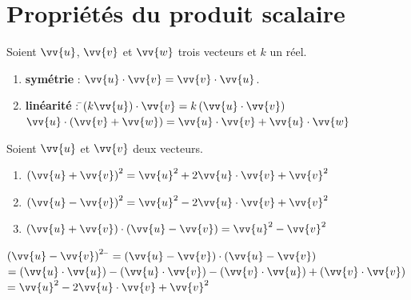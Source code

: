 \documentclass[a4paper,11pt,cours]{nsi} %
\begin{document}
\section{Propriétés du produit scalaire}
\begin{propriete}[s]
    Soient $\vv{u}$, $\vv{v}$ et $\vv{w}$ trois vecteurs et $k$ un réel.
    \begin{enumerate}[label=\textbullet]
        \item \textbf{symétrie} : $\vv{u} \cdot \vv{v} = \vv{v} \cdot \vv{u}$.
        \item \begin{tabbing}
            \textbf{linéarité} :  \=$\left(k\vv{u}\right) \cdot \vv{v} = k\left(\vv{u} \cdot \vv{v}\right)$\\
            \> $\vv{u} \cdot \left(\vv{v}+ \vv{w}\right) = \vv{u} \cdot \vv{v}+\vv{u}\cdot \vv{w}$\\
        \end{tabbing}
    \end{enumerate}
\end{propriete}

\begin{propriete}
    Soient $\vv{u}$ et $\vv{v}$ deux vecteurs.
    \begin{enumerate}[label=\textbullet]
        \item $\left(\vv{u}+\vv{v}\right)^2 = \vv{u}^2  + 2\vv{u} \cdot \vv{v}+ \vv{v}^2$
        \item $\left(\vv{u}-\vv{v}\right)^2 = \vv{u}^2  - 2\vv{u} \cdot \vv{v}+ \vv{v}^2$
        \item $\left(\vv{u}+\vv{v}\right) \cdot \left(\vv{u}-\vv{v}\right) = \vv{u}^2 - \vv{v}^2$
    \end{enumerate}
\end{propriete}

\begin{demonstration}[ (du point 2)]
    \begin{tabbing}
        $\left(\vv{u}-\vv{v}\right)^2$ \= $=\left(\vv{u}-\vv{v}\right) \cdot \left(\vv{u}-\vv{v}\right)$\\
        \> $=\left(\vv{u} \cdot \vv{u}\right) - \left(\vv{u} \cdot \vv{v}\right) - \left(\vv{v} \cdot \vv{u}\right) + \left(\vv{v} \cdot \vv{v}\right)$\\
        \> $=\vv{u}^2 - 2\vv{u} \cdot \vv{v}  + \vv{v}^2$
    \end{tabbing}
\end{demonstration}
\end{document}
